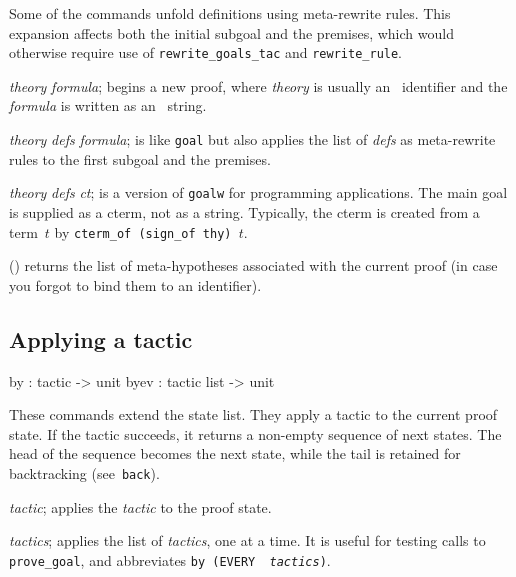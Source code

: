 Some of the commands unfold definitions using meta-rewrite rules.  This
expansion affects both the initial subgoal and the premises, which would
otherwise require use of \texttt{rewrite_goals_tac} and
\texttt{rewrite_rule}.

\begin{ttdescription}
\item[\ttindexbold{goal} {\it theory} {\it formula};] 
begins a new proof, where {\it theory} is usually an \ML\ identifier
and the {\it formula\/} is written as an \ML\ string.

\item[\ttindexbold{goalw} {\it theory} {\it defs} {\it formula};] 
is like \texttt{goal} but also applies the list of {\it defs\/} as
meta-rewrite rules to the first subgoal and the premises.

\item[\ttindexbold{goalw_cterm} {\it theory} {\it defs} {\it ct};] is
  a version of \texttt{goalw} for programming applications.  The main
  goal is supplied as a cterm, not as a string.  Typically, the cterm
  is created from a term~$t$ by \texttt{cterm_of (sign_of thy) $t$}.

\item[\ttindexbold{premises}()] 
returns the list of meta-hypotheses associated with the current proof (in
case you forgot to bind them to an \ML{} identifier).
\end{ttdescription}


\subsection{Applying a tactic}
\begin{ttbox} 
by   : tactic -> unit
byev : tactic list -> unit
\end{ttbox}
These commands extend the state list.  They apply a tactic to the current
proof state.  If the tactic succeeds, it returns a non-empty sequence of
next states.  The head of the sequence becomes the next state, while the
tail is retained for backtracking (see~\texttt{back}).
\begin{ttdescription} \item[\ttindexbold{by} {\it tactic};] 
applies the {\it tactic\/} to the proof state.

\item[\ttindexbold{byev} {\it tactics};] 
applies the list of {\it tactics}, one at a time.  It is useful for testing
calls to \texttt{prove_goal}, and abbreviates \texttt{by (EVERY {\it
tactics})}.
\end{ttdescription}

